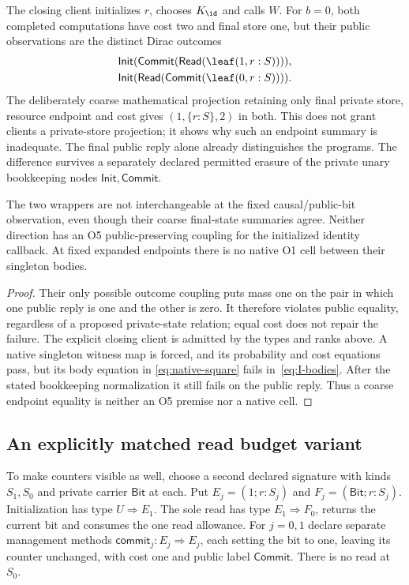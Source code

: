 The closing client initializes $r$, chooses $K_{\id}$ and calls $W$.
For $b=0$, both completed computations have cost two and final store one,
but their public observations are the distinct Dirac outcomes
\begin{align*}
&\mathsf{Init}(\mathsf{Commit}(\mathsf{Read}(\leaf(1,r:S)))),\\
&\mathsf{Init}(\mathsf{Read}(\mathsf{Commit}(\leaf(0,r:S)))).
\end{align*}
The deliberately coarse mathematical projection retaining only final
private store, resource endpoint and cost gives $(1,\{r:S\},2)$ in both.
This does not grant clients a private-store projection; it shows why
such an endpoint summary is inadequate. The final public reply alone
already distinguishes the programs. The difference survives a separately
declared permitted erasure of the private unary bookkeeping nodes
$\mathsf{Init},\mathsf{Commit}$.

\begin{proposition}
The two wrappers are not interchangeable at the fixed causal/public-bit
observation, even though their coarse final-state summaries agree.
Neither direction has an O5 public-preserving coupling for the initialized
identity callback. At fixed expanded endpoints there is no native O1
cell between their singleton bodies.
\end{proposition}
\begin{proof}
Their only possible outcome coupling puts mass one on the pair in which
one public reply is one and the other is zero. It therefore violates
public equality, regardless of a proposed private-state relation; equal
cost does not repair the failure. The explicit closing client is admitted
by the types and ranks above. A native singleton witness map is forced,
and its probability and cost equations pass, but its body equation in
\eqref{eq:native-square} fails in~\eqref{eq:I-bodies}. After the stated
bookkeeping normalization it still fails on the public reply. Thus a
coarse endpoint equality is neither an O5 premise nor a native cell.
\end{proof}

\subsection{An explicitly matched read budget variant}
To make counters visible as well, choose a second declared signature with
kinds $S_1,S_0$ and private carrier $\mathsf{Bit}$ at each. Put
$E_j=(1;r:S_j)$ and $F_j=(\mathsf{Bit};r:S_j)$. Initialization has type
$U\Rightarrow E_1$. The sole read has type $E_1\Rightarrow F_0$, returns
the current bit and consumes the one read allowance. For $j=0,1$ declare
separate management methods
$\mathsf{commit}_j:E_j\Rightarrow E_j$, each setting the bit to one,
leaving its counter unchanged, with cost one and public label
$\mathsf{Commit}$. There is no read at $S_0$.

